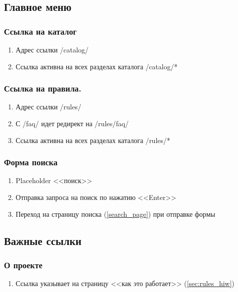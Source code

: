         \subsection{Главное меню}
            \label{baseitems_main_meu}
            \subsubsection{Ссылка на каталог}
                \begin{enumerate}
                    \item Адрес ссылки /catalog/
                    \item Ссылка активна на всех разделах каталога /catalog/*
                \end{enumerate}
            \subsubsection{Ссылка на правила.}
                \begin{enumerate}
                    \item Адрес ссылки /rules/
                    \item С /faq/ идет редирект на /rules/faq/
                    \item Ссылка активна на всех разделах каталога /rules/*
                \end{enumerate}
            
            \subsubsection{Форма поиска}
                \begin{enumerate}
                    \item Placeholder <<поиск>>
                    \item Отправка запроса на поиск по нажатию <<Enter>>
                    \item Переход на страницу поиска (\ref{search_page}) при отправке формы
                \end{enumerate}
        \subsection{Важные ссылки}
            \label{baseitems_important_links}
            \subsubsection{О проекте}
                \begin{enumerate}
                    \item Ссылка указывает на страницу <<как это работает>> (\ref{sec:rules_hiw})
                \end{enumerate}
